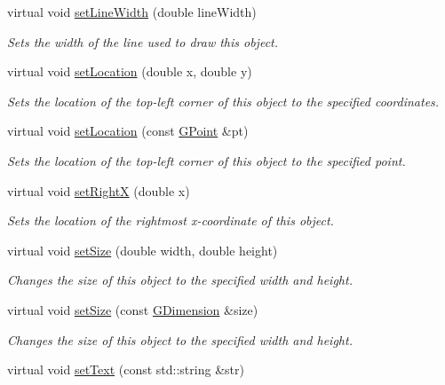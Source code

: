 \begin{DoxyCompactItemize}
virtual void \mbox{\hyperlink{classGObject_afd6a47c6ea6a1f85ca05a65ba3ff3477}{set\+Line\+Width}} (double line\+Width)
\begin{DoxyCompactList}\small\item\em Sets the width of the line used to draw this object. \end{DoxyCompactList}\item 
virtual void \mbox{\hyperlink{classGObject_a04594e8ba9b98513a64f1da00dcae18c}{set\+Location}} (double x, double y)
\begin{DoxyCompactList}\small\item\em Sets the location of the top-\/left corner of this object to the specified coordinates. \end{DoxyCompactList}\item 
virtual void \mbox{\hyperlink{classGObject_aa8480c0b7166cdf8f784cece06ab353f}{set\+Location}} (const \mbox{\hyperlink{classGPoint}{G\+Point}} \&pt)
\begin{DoxyCompactList}\small\item\em Sets the location of the top-\/left corner of this object to the specified point. \end{DoxyCompactList}\item 
virtual void \mbox{\hyperlink{classGObject_a3c90b758cdc2c911c9ef76c4360eb912}{set\+RightX}} (double x)
\begin{DoxyCompactList}\small\item\em Sets the location of the rightmost x-\/coordinate of this object. \end{DoxyCompactList}\item 
virtual void \mbox{\hyperlink{classGObject_aca25d49481f9bf5fc8f7df4c086c4ce7}{set\+Size}} (double width, double height)
\begin{DoxyCompactList}\small\item\em Changes the size of this object to the specified width and height. \end{DoxyCompactList}\item 
virtual void \mbox{\hyperlink{classGObject_ae2b628228f192c2702c4ce941b2af68f}{set\+Size}} (const \mbox{\hyperlink{classGDimension}{G\+Dimension}} \&size)
\begin{DoxyCompactList}\small\item\em Changes the size of this object to the specified width and height. \end{DoxyCompactList}\item 
virtual void \mbox{\hyperlink{classGText_ac98cbe102af8aaf8fd017228d645bfda}{set\+Text}} (const std\+::string \&str)

\end{DoxyCompactItemize}
